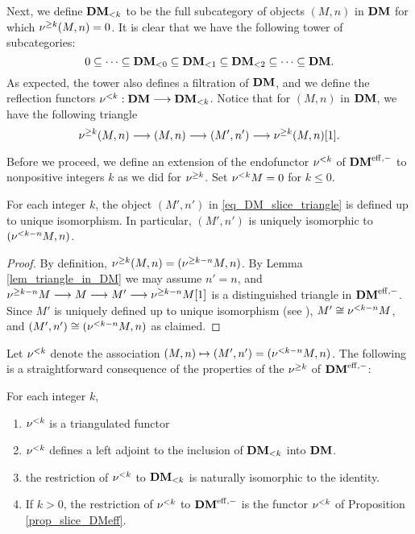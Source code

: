 Next, we define $\LFiltDM[k]{\DM}$ to be the full subcategory of 
objects $(M, n)$ in $\DM$ for which $\sgDM{k}(M, n) = 0$. It is
clear that we have the following tower of subcategories:
\begin{equation}\label{eq_DM_slice_cofilt}
0 \subseteq \cdots \subseteq \LFiltDM[0]{\DM} \subseteq 
   \LFiltDM[1]{\DM} \subseteq \LFiltDM[2]{\DM} \subseteq \cdots 
   \subseteq \DM.
\end{equation}
As expected, the tower also defines a filtration of $\DM$, and
we define the reflection functors $\slDM{k} : \DM \to 
\LFiltDM[k]{\DM}$. Notice that for $(M, n)$ in $\DM$, we have the 
following triangle
\begin{equation}\label{eq_DM_slice_triangle}
\sgDM{k} (M, n) \to (M, n) \to (M', n') \to \sgDM{k} (M, n)[1].
\end{equation}

Before we proceed, we define an extension of the endofunctor 
$\slDM{k}$ of $\DMeff$ to nonpositive integers $k$ as we did for 
$\sgDM{k}$. Set $\slDM{k} M = 0$ for $k \leq 0$.

\begin{lem}
For each integer $k$, the object $(M', n')$ in 
\eqref{eq_DM_slice_triangle} is defined up to unique isomorphism.
In particular, $(M', n')$ is uniquely isomorphic to 
$(\slDM{k - n} M, n)$.
\end{lem}
\begin{proof}
  By definition, $\sgDM{k}(M, n) = (\sgDM{k - n}M, n)$. By Lemma
  \ref{lem_triangle_in_DM} we may assume $n' = n$, and $\sgDM{k -
    n} M \to M \to M' \to \sgDM{k - n}M[1]$ is a distinguished
  triangle in $\DMeff$. Since $M'$ is uniquely defined up to unique
  isomorphism (see \cite[1.3(i)]{HuKa}), $M' \cong \slDM{k - n} M$,
  and $(M', n') \cong (\slDM{k - n}M, n)$ as claimed.
\end{proof}

Let $\slDM{k}$ denote the association $(M, n) \mapsto (M', n') =
(\slDM{k - n}M, n)$. The following is a straightforward consequence
of the properties of the $\sgDM{k}$ of $\DMeff$:

\begin{prop}\label{prop_slDM_functor}
For each integer $k$,
\begin{enumerate}
\item $\slDM{k}$ is a triangulated functor

\item $\slDM{k}$ defines a left adjoint to the inclusion of 
$\LFiltDM[k]{\DM}$ into $\DM$.

\item the restriction of $\slDM{k}$ to $\LFiltDM[k]{\DM}$ is naturally
isomorphic to the identity.

\item If $k \gt 0$, the restriction of $\slDM{k}$ to $\DMeff$ is the
  functor $\slDM{k}$ of Proposition \ref{prop_slice_DMeff}.
\end{enumerate}
\end{prop}

